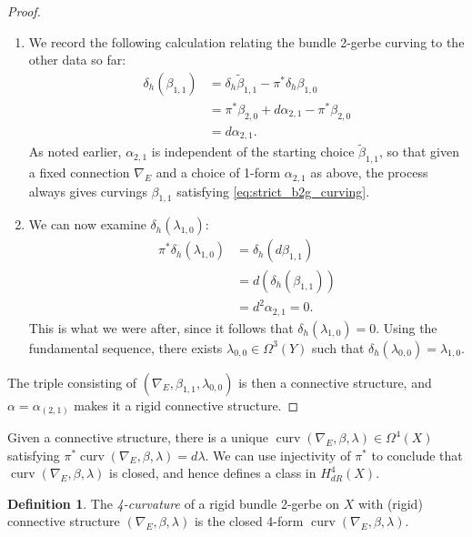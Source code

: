 \documentclass[12pt]{amsart}
\theoremstyle{plain}
\theoremstyle{definition}
\newtheorem{definition}[theorem]{Definition}
\theoremstyle{remark}
\numberwithin{equation}{section}
\DeclareMathOperator{\curv}{curv}
\newcommand{\<}{\langle}
\renewcommand{\>}{\rangle}
\begin{document}
\begin{proof}
\begin{enumerate}
\item We record the following calculation relating the bundle 2-gerbe curving to the other data so far:
\begin{align}\label{eq:strict_b2g_curving}
\delta_h(\beta_{1,1}) 
  & = \delta_h\widetilde\beta_{1,1} - \pi^*\delta_h\beta_{1,0} \nonumber\\
  & = \pi^*\beta_{2,0} + d\alpha_{2,1} - \pi^*\beta_{2,0}\\
  & = d\alpha_{2,1}. \nonumber
\end{align}
As noted earlier, $\alpha_{2,1}$ is independent of the starting choice $\widetilde\beta_{1,1}$, so that given a fixed connection $\nabla_E$ and a choice of 1-form $\alpha_{2,1}$ as above, the process always gives curvings $\beta_{1,1}$ satisfying \eqref{eq:strict_b2g_curving}.



\item We can now examine $\delta_h(\lambda_{1,0})$:
\begin{align*}
\pi^*\delta_h(\lambda_{1,0}) 
  & = \delta_h(d\beta_{1,1})\\
  & = d(\delta_h(\beta_{1,1}))\\
  & = d^2\alpha_{2,1} = 0.
\end{align*}
This is what we were after, since it follows that $\delta_h(\lambda_{1,0})=0$. Using the fundamental sequence, there exists $\lambda_{0,0}\in \Omega^3(Y)$ such that $\delta_h(\lambda_{0,0}) = \lambda_{1,0}$.
\end{enumerate}

The triple consisting of $(\nabla_E, \beta_{1,1}, \lambda_{0,0})$ is then a connective structure, and $\alpha = \alpha_{(2,1)}$ makes it a rigid connective structure.
\end{proof}


Given a connective structure, there is a unique $\curv(\nabla_E,\beta,\lambda)\in \Omega^4(X)$ satisfying $\pi^*\curv(\nabla_E,\beta,\lambda) = d\lambda$.
We can use injectivity of $\pi^*$ to conclude that $\curv(\nabla_E,\beta,\lambda)$ is closed, and hence defines a class in $H^4_{dR}(X)$. 

\begin{definition}
The \emph{4-curvature} of a rigid bundle 2-gerbe on $X$ with (rigid) connective structure $(\nabla_E,\beta,\lambda)$ is the closed 4-form $\curv(\nabla_E,\beta,\lambda)$.  
\end{definition}
\end{document}

